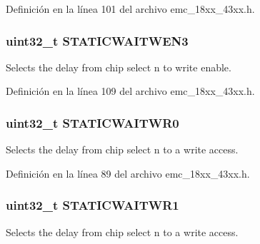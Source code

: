 Definición en la línea 101 del archivo emc\+\_\+18xx\+\_\+43xx.\+h.

\subsubsection[{\texorpdfstring{S\+T\+A\+T\+I\+C\+W\+A\+I\+T\+W\+E\+N3}{STATICWAITWEN3}}]{ uint32\+\_\+t S\+T\+A\+T\+I\+C\+W\+A\+I\+T\+W\+E\+N3}\hypertarget{struct_l_p_c___e_m_c___t_a0ca3223c70d97a5d53e388ff025c9e72}{}\label{struct_l_p_c___e_m_c___t_a0ca3223c70d97a5d53e388ff025c9e72}
Selects the delay from chip select n to write enable. 

Definición en la línea 109 del archivo emc\+\_\+18xx\+\_\+43xx.\+h.

\subsubsection[{\texorpdfstring{S\+T\+A\+T\+I\+C\+W\+A\+I\+T\+W\+R0}{STATICWAITWR0}}]{ uint32\+\_\+t S\+T\+A\+T\+I\+C\+W\+A\+I\+T\+W\+R0}\hypertarget{struct_l_p_c___e_m_c___t_a0ccf488826dae4a0d482463a8c4f6b1c}{}\label{struct_l_p_c___e_m_c___t_a0ccf488826dae4a0d482463a8c4f6b1c}
Selects the delay from chip select n to a write access. 

Definición en la línea 89 del archivo emc\+\_\+18xx\+\_\+43xx.\+h.

\subsubsection[{\texorpdfstring{S\+T\+A\+T\+I\+C\+W\+A\+I\+T\+W\+R1}{STATICWAITWR1}}]{ uint32\+\_\+t S\+T\+A\+T\+I\+C\+W\+A\+I\+T\+W\+R1}\hypertarget{struct_l_p_c___e_m_c___t_a309c113a287a66173c9e6c35c28b2461}{}\label{struct_l_p_c___e_m_c___t_a309c113a287a66173c9e6c35c28b2461}
Selects the delay from chip select n to a write access. 

